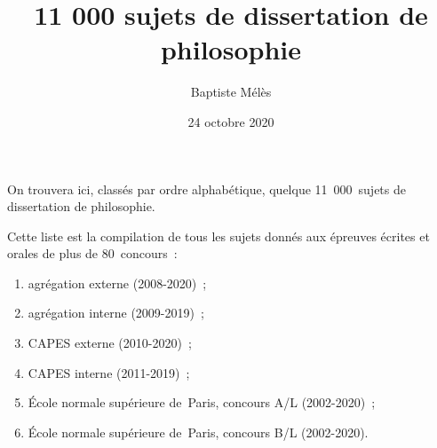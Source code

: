 \documentclass[a4paper,12pt]{article}
\author{Baptiste Mélès}
\date{24 octobre 2020}
\title{11 000 sujets de dissertation de philosophie}
\begin{document}
\maketitle

On trouvera ici, classés par ordre alphabétique, quelque 11 000 sujets
de dissertation de philosophie.

Cette liste est la compilation de tous les sujets donnés aux épreuves
écrites et orales de plus de 80 concours :
\begin{enumerate}
\item agrégation externe (2008-2020) ;
\item agrégation interne (2009-2019) ;
\item CAPES externe (2010-2020) ;
\item CAPES interne (2011-2019) ;
\item École normale supérieure de Paris, concours A​/​L (2002-2020) ;
\item École normale supérieure de Paris, concours B​/​L (2002-2020).
\end{enumerate}

\bigskip
\end{document}
